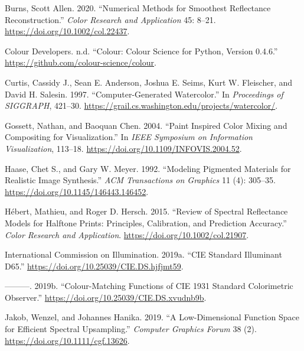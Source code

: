 \documentclass[
  10pt,
  twocolumn]{article}
\newlength{\cslhangindent}
\newlength{\cslentryspacingunit} %
\newenvironment{CSLReferences}[2] %
 {%
  \setlength{\parindent}{0pt}
  \ifodd #1
  \let\oldpar\par
  \def\par{\hangindent=\cslhangindent\oldpar}
  \fi
  \setlength{\parskip}{#2\cslentryspacingunit}
 }%
 {}
\begin{document}
\hypertarget{refs}{}
\begin{CSLReferences}{1}{0}
\leavevmode{}%
Burns, Scott Allen. 2020. {``Numerical Methods for Smoothest Reflectance
Reconstruction.''} \emph{Color Research and Application} 45: 8--21.
\url{https://doi.org/10.1002/col.22437}.

\leavevmode{}%
Colour Developers. n.d. {``Colour: Colour Science for Python, Version
0.4.6.''} \url{https://github.com/colour-science/colour}.

\leavevmode{}%
Curtis, Cassidy J., Sean E. Anderson, Joshua E. Seims, Kurt W.
Fleischer, and David H. Salesin. 1997. {``Computer-Generated
Watercolor.''} In \emph{Proceedings of SIGGRAPH}, 421--30.
\url{https://grail.cs.washington.edu/projects/watercolor/}.

\leavevmode{}%
Gossett, Nathan, and Baoquan Chen. 2004. {``Paint Inspired Color Mixing
and Compositing for Visualization.''} In \emph{IEEE Symposium on
Information Visualization}, 113--18.
\url{https://doi.org/10.1109/INFOVIS.2004.52}.

\leavevmode{}%
Haase, Chet S., and Gary W. Meyer. 1992. {``Modeling Pigmented Materials
for Realistic Image Synthesis.''} \emph{ACM Transactions on Graphics} 11
(4): 305--35. \url{https://doi.org/10.1145/146443.146452}.

\leavevmode{}%
Hébert, Mathieu, and Roger D. Hersch. 2015. {``Review of Spectral
Reflectance Models for Halftone Prints: Principles, Calibration, and
Prediction Accuracy.''} \emph{Color Research and Application}.
\url{https://doi.org/10.1002/col.21907}.

\leavevmode{}%
International Commission on Illumination. 2019a. {``{CIE} Standard
Illuminant {D65}.''} \url{https://doi.org/10.25039/CIE.DS.hjfjmt59}.

\leavevmode{}%
---------. 2019b. {``Colour-Matching Functions of {CIE} 1931 Standard
Colorimetric Observer.''}
\url{https://doi.org/10.25039/CIE.DS.xvudnb9b}.

\leavevmode{}%
Jakob, Wenzel, and Johannes Hanika. 2019. {``A Low-Dimensional Function
Space for Efficient Spectral Upsampling.''} \emph{Computer Graphics
Forum} 38 (2). \url{https://doi.org/10.1111/cgf.13626}.


\end{CSLReferences}
\end{document}
